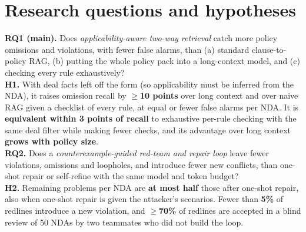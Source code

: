 \documentclass[11pt,a4paper]{article}
\begin{document}
\section{Research questions and hypotheses}
\begin{keybox}
\textbf{RQ1 (main).} Does \emph{applicability-aware two-way retrieval} catch more policy omissions and violations, with fewer false alarms, than (a) standard clause-to-policy RAG, (b) putting the whole policy pack into a long-context model, and (c) checking every rule exhaustively?\\[2pt]
\textbf{H1.} With deal facts left off the form (so applicability must be inferred from the NDA), it raises omission recall by \textbf{$\geq$10 points} over long context and over naive RAG given a checklist of every rule, at equal or fewer false alarms per NDA. It is \textbf{equivalent within 3 points of recall} to exhaustive per-rule checking with the same deal filter while making fewer checks, and its advantage over long context \textbf{grows with policy size}.\\[4pt]
\textbf{RQ2.} Does a \emph{counterexample-guided red-team and repair loop} leave fewer violations, omissions and loopholes, and introduce fewer new conflicts, than one-shot repair or self-refine with the same model and token budget?\\[2pt]
\textbf{H2.} Remaining problems per NDA are \textbf{at most half} those after one-shot repair, also when one-shot repair is given the attacker's scenarios. Fewer than \textbf{5\%} of redlines introduce a new violation, and \textbf{$\geq$70\%} of redlines are accepted in a blind review of 50 NDAs by two teammates who did not build the loop.
\end{keybox}

\end{document}
